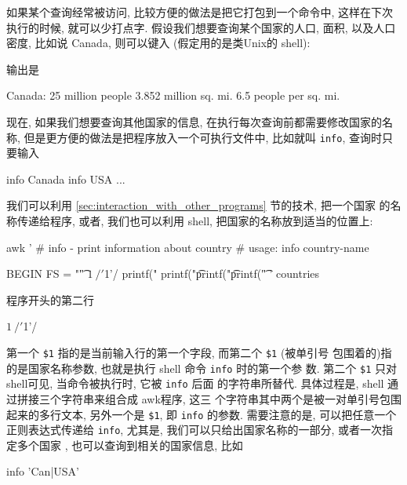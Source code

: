 如果某个查询经常被访问, 比较方便的做法是把它打包到一个命令中, 这样在下次
执行的时候, 就可以少打点字. 假设我们想要查询某个国家的人口, 面积, 以及人口 
密度, 比如说 Canada, 则可以键入 (假定用的是类Unix的 shell):
输出是 
\begin{shell}
    Canada:
        25 million people
        3.852 million sq. mi.
        6.5 people per sq. mi.
\end{shell}
现在, 如果我们想要查询其他国家的信息, 在执行每次查询前都需要修改国家的名称,
但是更方便的做法是把程序放入一个可执行文件中, 比如就叫 \verb'info',
查询时只要输入
\begin{awkcode}
    info Canada
    info USA
    ...
\end{awkcode}
我们可以利用 
\ref{sec:interaction_with_other_programs}
 节的技术, 把一个国家
的名称传递给程序, 或者, 我们也可以利用 shell, 把国家的名称放到适当的位置上:
\begin{awkcode}
    awk '
    # info - print information about country
    #    usage: info country-name

    BEGIN { FS = "\t" }
    $1 ~ /'$1'/ {
        printf("%
        printf("\t%
        printf("\t%
        printf("\t%
    }
    ' countries
\end{awkcode}
程序开头的第二行
\begin{awkcode}
    $1 ~ /'$1'/
\end{awkcode}
第一个 \verb'$1' 指的是当前输入行的第一个字段, 而第二个 \verb'$1' (被单引号
包围着的)指的是国家名称参数, 也就是执行 shell 命令 \verb'info' 时的第一个参
数. 第二个 \verb'$1' 只对shell可见, 当命令被执行时, 它被 \verb'info' 后面 
的字符串所替代. 具体过程是, shell 通过拼接三个字符串来组合成 awk程序, 这三 
个字符串其中两个是被一对单引号包围起来的多行文本, 另外一个是 \verb'$1',
即 \texttt{info} 的参数. 需要注意的是, 可以把任意一个正则表达式传递给
\texttt{info}, 尤其是, 我们可以只给出国家名称的一部分, 或者一次指定多个国家
, 也可以查询到相关的国家信息, 比如 
\begin{awkcode}
    info 'Can|USA'
\end{awkcode}

